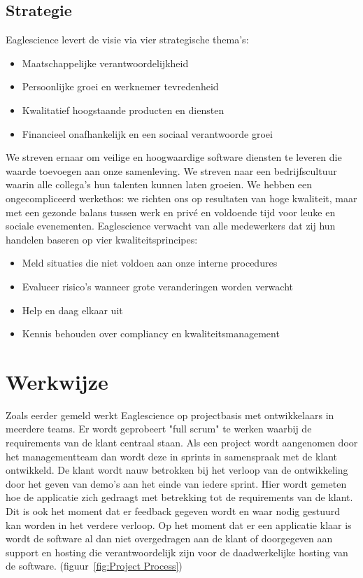 \subsection{Strategie}\label{subsec:strategie}
Eaglescience levert de visie via vier strategische thema's:
\begin{itemize}
    \item Maatschappelijke verantwoordelijkheid
    \item Persoonlijke groei en werknemer tevredenheid
    \item Kwalitatief hoogstaande producten en diensten
    \item Financieel onafhankelijk en een sociaal verantwoorde groei
\end{itemize}
We streven ernaar om veilige en hoogwaardige software diensten te leveren die waarde toevoegen aan onze samenleving. We streven naar een bedrijfscultuur waarin alle collega's hun talenten kunnen laten groeien. We hebben een ongecompliceerd werkethos: we richten ons op resultaten van hoge kwaliteit, maar met een gezonde balans tussen werk en privé en voldoende tijd voor leuke en sociale evenementen. Eaglescience verwacht van alle medewerkers dat zij hun handelen baseren op vier kwaliteitsprincipes:
\begin{itemize}
    \item Meld situaties die niet voldoen aan onze interne procedures
    \item Evalueer risico's wanneer grote veranderingen worden verwacht
    \item Help en daag elkaar uit
    \item Kennis behouden over compliancy en kwaliteitsmanagement
\end{itemize}

\section{Werkwijze}\label{sec:werkwijze}
Zoals eerder gemeld werkt Eaglescience op projectbasis met ontwikkelaars in meerdere teams. Er wordt geprobeert "full scrum" te werken waarbij de requirements van de klant centraal staan. Als een project wordt aangenomen door het managementteam dan wordt deze in sprints in samenspraak met de klant ontwikkeld. De klant wordt nauw betrokken bij het verloop van de ontwikkeling door het geven van demo's aan het einde van iedere sprint. Hier wordt gemeten hoe de applicatie zich gedraagt met betrekking tot de requirements van de klant. Dit is ook het moment dat er feedback gegeven wordt en waar nodig gestuurd kan worden in het verdere verloop. Op het moment dat er een applicatie klaar is wordt de software al dan niet overgedragen aan de klant of doorgegeven aan support en hosting die verantwoordelijk zijn voor de daadwerkelijke hosting van de software. (figuur~\ref{fig:Project Process})

